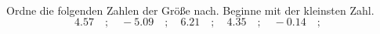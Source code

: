 \begin{aufgabe} ~ \\ 
Ordne die folgenden Zahlen der Gr\"o\ss{}e nach. Beginne mit der kleinsten Zahl.\[4.57\quad ; \quad-5.09\quad ; \quad6.21\quad ; \quad4.35\quad ; \quad-0.14\quad ; \quad\]\end{aufgabe} 
